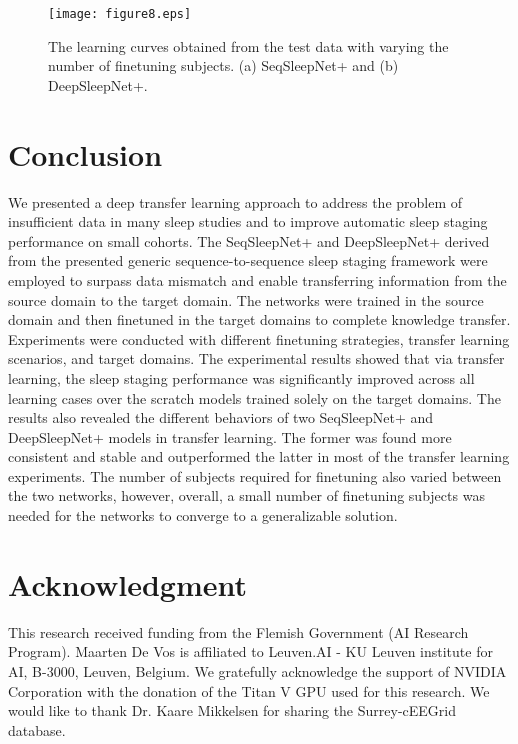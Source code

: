 \documentclass[journal,twoside,web]{ieeecolor}
\begin{document}
\begin{figure} [!t]
	\centering
	\texttt{[image: figure8.eps]}
	\caption{The learning curves obtained from the test data with varying the number of finetuning subjects. (a) SeqSleepNet+ and (b) DeepSleepNet+.}
	\label{fig:influence_nosub}
	\vspace{-0.25cm}
\end{figure}
\vspace{-0.25cm}
\section{Conclusion}
We presented a deep transfer learning approach to address the problem of insufficient data in many sleep studies and to improve automatic sleep staging performance on small cohorts. The SeqSleepNet+ and DeepSleepNet+ derived from the presented generic sequence-to-sequence sleep staging framework were employed to surpass data mismatch and enable transferring information from the source domain to the target domain. The networks were trained in the source domain and then finetuned in the target domains to complete knowledge transfer. Experiments were conducted with different finetuning strategies, transfer learning scenarios, and target domains. The experimental results showed that via transfer learning, the sleep staging performance was significantly improved across all learning cases over the scratch models trained solely on the target domains. The results also revealed the different behaviors of two SeqSleepNet+ and DeepSleepNet+ models in transfer learning. The former was found more consistent and stable and outperformed the latter in most of the transfer learning experiments. The number of subjects required for finetuning also varied between the two networks, however, overall, a small number of finetuning subjects was needed for the networks to converge to a generalizable solution.

\vspace{-0.25cm}
\section*{Acknowledgment}
\vspace{-0.1cm}
This research received funding from the Flemish Government (AI Research Program). Maarten De Vos is affiliated to Leuven.AI - KU Leuven institute for AI, B-3000, Leuven, Belgium. We gratefully acknowledge the support of NVIDIA Corporation with the donation of the Titan V GPU used for this research. We would like to thank Dr. Kaare Mikkelsen for sharing the Surrey-cEEGrid database.



\vspace{-0.35cm}


\end{document}
